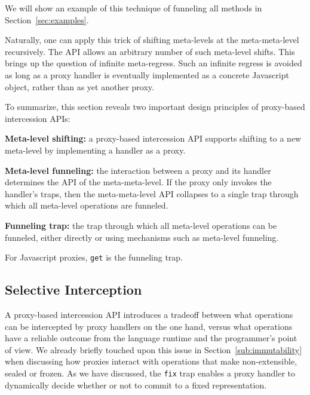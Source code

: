 \documentclass{acm_proc_article-sp}
\begin{document}
We will show an example of this technique of funneling all methods in Section~\ref{sec:examples}.

Naturally, one can apply this trick of shifting meta-levels at the meta-meta-level recursively. The API allows an arbitrary number of such meta-level shifts. This brings up the question of infinite meta-regress. Such an infinite regress is avoided as long as a proxy handler is eventually implemented as a concrete Javascript object, rather than as yet another proxy.

To summarize, this section reveals two important design principles of proxy-based intercession APIs:

\textbf{Meta-level shifting:} a proxy-based intercession API supports shifting to a new meta-level by implementing a handler as a proxy.

\textbf{Meta-level funneling:} the interaction between a proxy and its handler determines the API of the meta-meta-level. If the proxy only invokes the handler's traps, then the meta-meta-level API collapses to a single trap through which all meta-level operations are funneled.

\textbf{Funneling trap:} the trap through which all meta-level operations can be funneled, either directly or using mechanisms such as meta-level funneling.

For Javascript proxies, \texttt{get} is the funneling trap.

\subsection{Selective Interception}

A proxy-based intercession API introduces a tradeoff between what operations can be intercepted by proxy handlers on the one hand, versus what operations have a reliable outcome from the language runtime and the programmer's point of view. We already briefly touched upon this issue in Section~\ref{sub:immutability} when discussing how proxies interact with operations that make non-extensible, sealed or frozen. As we have discussed, the \texttt{fix} trap enables a proxy handler to dynamically decide whether or not to commit to a fixed representation.
\end{document}
